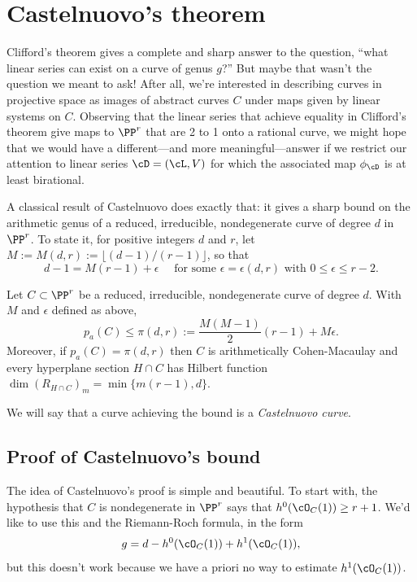  \section{Castelnuovo's theorem}\label{CastelnuovoSection}

Clifford's theorem gives a complete and sharp answer to the question, ``what linear series can exist on a curve of genus $g$?''
But maybe that wasn't the question we meant to ask! After all, we're interested in describing curves in projective space as images of abstract curves $C$ under maps given by linear systems on $C$. Observing that the linear series that achieve equality in Clifford's theorem give maps to $\PP^r$ that are 2 to 1 onto a rational curve, we might hope that we would have a different---and more meaningful---answer if we  restrict our attention to linear series $\cD = (\cL,V)$ for which the associated map $\phi_\cD$ is at least  birational. 

A classical result of Castelnuovo does exactly that: it gives a sharp bound on the arithmetic genus of a reduced, irreducible, nondegenerate curve of degree $d$ in $\PP^r$. To state it, for positive integers $d$ and $r$, let $M := M(d,r) := \lfloor(d-1)/(r-1)\rfloor$, so that
$$
 d -1 = M(r-1) + \epsilon \quad \text{ for some $\epsilon = \epsilon(d,r)$ with }0 \leq \epsilon \leq r-2. 
$$

\begin{theorem}\label{Castelnuovo's bound}
Let $C \subset \PP^r$ be a reduced, irreducible, nondegenerate curve of degree $d$. With $M$ and $\epsilon$ defined
as above,
$$
p_a(C) \leq \pi(d,r) := \frac{M(M-1)}{2}(r-1) + M\epsilon.
$$
Moreover, if $p_a(C) = \pi(d,r)$  then $C$ is arithmetically Cohen-Macaulay and every hyperplane
section $H\cap C$ has Hilbert function
$
\dim (R_{H\cap C})_{m} = \min\{m(r-1), d\}.
$
\end{theorem}

We will say that a curve achieving the bound is a \emph{Castelnuovo curve}.  

\subsection{Proof of Castelnuovo's bound}

The idea of Castelnuovo's proof is simple and beautiful. To start with, the hypothesis that $C$ is nondegenerate in $\PP^r$ says that $h^0(\cO_C(1)) \geq r+1$. We'd like to use this and the Riemann-Roch formula, in the form
$$
g = d - h^0(\cO_C(1)) + h^1(\cO_C(1)),
$$
but this doesn't work because we have a priori no way to estimate $h^1(\cO_C(1))$.

